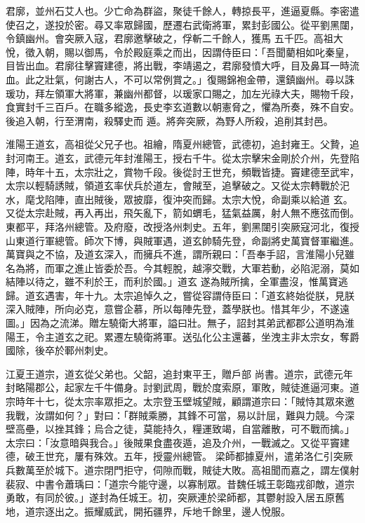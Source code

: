 \begin{pinyinscope}
 君廓，並州石艾人也。少亡命為群盜，聚徒千餘人，轉掠長平，進逼夏縣。李密遣使召之，遂投於密。尋又率眾歸國，歷遷右武衛將軍，累封彭國公。從平劉黑闥，令鎮幽州。會突厥入寇，君廓邀擊破之，俘斬二千餘人，獲馬
 五千匹。高祖大悅，徵入朝，賜以御馬，令於殿庭乘之而出，因謂侍臣曰：「吾聞藺相如叱秦皇，目皆出血。君廓往擊竇建德，將出戰，李靖遏之，君廓發憤大呼，目及鼻耳一時流血。此之壯氣，何謝古人，不可以常例賞之。」復賜錦袍金帶，還鎮幽州。尋以誅瑗功，拜左領軍大將軍，兼幽州都督，以瑗家口賜之，加左光祿大夫，賜物千段，食實封千三百戶。在職多縱逸，長史李玄道數以朝憲脅之，懼為所奏，殊不自安。後追入朝，行至渭南，殺驛史而
 遁。將奔突厥，為野人所殺，追削其封邑。



 淮陽王道玄，高祖從父兄子也。祖繪，隋夏州總管，武德初，追封雍王。父贄，追封河南王。道玄，武德元年封淮陽王，授右千牛。從太宗擊宋金剛於介州，先登陷陣，時年十五，太宗壯之，賞物千段。後從討王世充，頻戰皆捷。竇建德至武牢，太宗以輕騎誘賊，領道玄率伏兵於道左，會賊至，追擊破之。又從太宗轉戰於汜水，麾戈陷陣，直出賊後，眾披靡，復沖突而歸。太宗大悅，命副乘以給道
 玄。又從太宗赴賊，再入再出，飛矢亂下，箭如蝟毛，猛氣益厲，射人無不應弦而倒。東都平，拜洛州總管。及府廢，改授洛州刺史。五年，劉黑闥引突厥寇河北，復授山東道行軍總管。師次下博，與賊軍遇，道玄帥騎先登，命副將史萬寶督軍繼進。萬寶與之不協，及道玄深入，而擁兵不進，謂所親曰：「吾奉手詔，言淮陽小兒雖名為將，而軍之進止皆委於吾。今其輕脫，越濘交戰，大軍若動，必陷泥溺，莫如結陣以待之，雖不利於王，而利於國。」道玄
 遂為賊所擒，全軍盡沒，惟萬寶逃歸。道玄遇害，年十九。太宗追悼久之，嘗從容謂侍臣曰：「道玄終始從朕，見朕深入賊陣，所向必克，意嘗企慕，所以每陣先登，蓋學朕也。惜其年少，不遂遠圖。」因為之流涕。贈左驍衛大將軍，謚曰壯。無子，詔封其弟武都郡公道明為淮陽王，令主道玄之祀。累遷左驍衛將軍。送弘化公主還蕃，坐洩主非太宗女，奪爵國除，後卒於鄆州刺史。



 江夏王道宗，道玄從父弟也。父韶，追封東平王，贈戶部
 尚書。道宗，武德元年封略陽郡公，起家左千牛備身。討劉武周，戰於度索原，軍敗，賊徒進逼河東。道宗時年十七，從太宗率眾拒之。太宗登玉壁城望賊，顧謂道宗曰：「賊恃其眾來邀我戰，汝謂如何？」對曰：「群賊乘勝，其鋒不可當，易以計屈，難與力競。今深壁高壘，以挫其鋒；烏合之徒，莫能持久，糧運致竭，自當離散，可不戰而擒。」太宗曰：「汝意暗與我合。」後賊果食盡夜遁，追及介州，一戰滅之。又從平竇建德，破王世充，屢有殊效。五年，授靈州總管。
 梁師都據夏州，遣弟洛仁引突厥兵數萬至於城下。道宗閉門拒守，伺隙而戰，賊徒大敗。高祖聞而嘉之，謂左僕射裴寂、中書令蕭瑀曰：「道宗今能守邊，以寡制眾。昔魏任城王彰臨戎卻敵，道宗勇敢，有同於彼。」遂封為任城王。初，突厥連於梁師都，其鬱射設入居五原舊地，道宗逐出之。振耀威武，開拓疆界，斥地千餘里，邊人悅服。




\end{pinyinscope}
